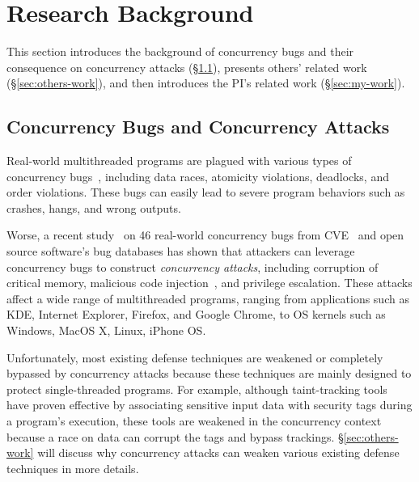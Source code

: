 
\section{Research Background} \label{sec:related}

This section introduces the background of concurrency bugs and 
their consequence on concurrency attacks (\S\ref{sec:background}), 
presents others' related work (\S\ref{sec:others-work}), and then introduces 
the PI's related work (\S\ref{sec:my-work}).

\subsection{Concurrency Bugs and Concurrency Attacks} 
\label{sec:background}

Real-world multithreaded programs are plagued with various types of concurrency 
bugs~\cite{lu:concurrency-bugs}, including data races, atomicity violations, 
deadlocks, and order violations. These bugs can easily lead to severe program 
behaviors such as crashes, hangs, and wrong outputs.



Worse, a recent study~\cite{con:hotpar12} on 46 real-world concurrency bugs 
from CVE~\cite{cve-races} and open source software's bug databases has shown 
that attackers can leverage concurrency bugs to construct \emph{concurrency 
attacks}, including corruption of critical memory, malicious 
code injection~\cite{libsafe:bug}, and privilege escalation. These attacks 
affect a wide range of multithreaded programs, ranging from applications such as 
KDE, Internet Explorer, Firefox, and Google Chrome, to OS kernels such as 
Windows, MacOS X, Linux, iPhone OS.

Unfortunately, most existing defense techniques are weakened or completely 
bypassed by concurrency attacks because these techniques are mainly designed to 
protect single-threaded programs. For example, although taint-tracking 
tools~\cite{taintdroid:osdi10, lift:micro06, myers:information, 
valgrind:pldi} have proven effective by associating sensitive input data
with security tags during a program's execution, these tools are weakened in 
the concurrency context because a race on data can corrupt the tags and bypass 
trackings. \S\ref{sec:others-work} will discuss why concurrency attacks can 
weaken various existing defense techniques in more details.


